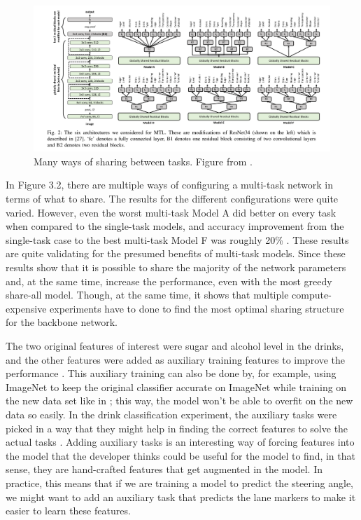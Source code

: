 \begin{figure}[h!]
    \centering
    \includegraphics[width=1\textwidth]{imgs/multipleShares.png}
    \caption{Many ways of sharing between tasks. Figure from \citep{healthyDrink}.\label{fig:params}}
\end{figure}

In Figure 3.2, there are multiple ways of configuring a multi-task network in terms of what to share.
The results for the different configurations were quite varied.
However, even the worst multi-task Model A did better on every task when compared to the single-task models, and accuracy improvement from the single-task case to the best multi-task Model F was roughly 20\% \citep{healthyDrink}.
These results are quite validating for the presumed benefits of multi-task models.
Since these results show that it is possible to share the majority of the network parameters and, at the same time, increase the performance, even with the most greedy share-all model.
Though, at the same time, it shows that multiple compute-expensive experiments have to done to find the most optimal sharing structure for the backbone network.

The two original features of interest were sugar and alcohol level in the drinks, and the other features were added as auxiliary training features to improve the performance \citep{healthyDrink}.
This auxiliary training can also be done by, for example, using ImageNet to keep the original classifier accurate on ImageNet while training on the new data set like in \citep{biologicalMultitask}; this way, the model won't be able to overfit on the new data so easily.
In the drink classification experiment, the auxiliary tasks were picked in a way that they might help in finding the correct features to solve the actual tasks \citep{healthyDrink}.
Adding auxiliary tasks is an interesting way of forcing features into the model that the developer thinks could be useful for the model to find, in that sense, they are hand-crafted features that get augmented in the model.
In practice, this means that if we are training a model to predict the steering angle, we might want to add an auxiliary task that predicts the lane markers to make it easier to learn these features.

